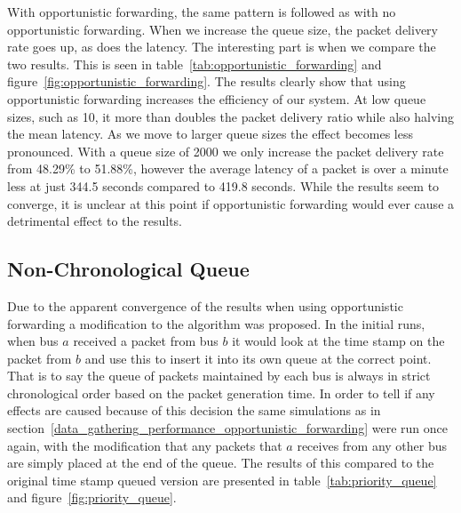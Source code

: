         With opportunistic forwarding, the same pattern is followed as with no opportunistic forwarding. When we increase the queue size, the packet delivery rate goes up, as does the latency. The interesting part is when we compare the two results. This is seen in table~\ref{tab:opportunistic_forwarding} and figure~\ref{fig:opportunistic_forwarding}. The results clearly show that using opportunistic forwarding increases the efficiency of our system. At low queue sizes, such as 10, it more than doubles the packet delivery ratio while also halving the mean latency. As we move to larger queue sizes the effect becomes less pronounced. With a queue size of 2000 we only increase the packet delivery rate from 48.29\% to 51.88\%, however the average latency of a packet is over a minute less at just 344.5 seconds compared to 419.8 seconds. While the results seem to converge, it is unclear at this point if opportunistic forwarding would ever cause a detrimental effect to the results. 


    \subsection{Non-Chronological Queue}\label{data_gathering_performance_non-chronological_queue}

        Due to the apparent convergence of the results when using opportunistic forwarding a modification to the algorithm was proposed. In the initial runs, when bus $a$ received a packet from bus $b$ it would look at the time stamp on the packet from $b$ and use this to insert it into its own queue at the correct point. That is to say the queue of packets maintained by each bus is always in strict chronological order based on the packet generation time. In order to tell if any effects are caused because of this decision the same simulations as in section~\ref{data_gathering_performance_opportunistic_forwarding} were run once again, with the modification that any packets that $a$ receives from any other bus are simply placed at the end of the queue. The results of this compared to the original time stamp queued version are presented in table~\ref{tab:priority_queue} and figure~\ref{fig:priority_queue}.

